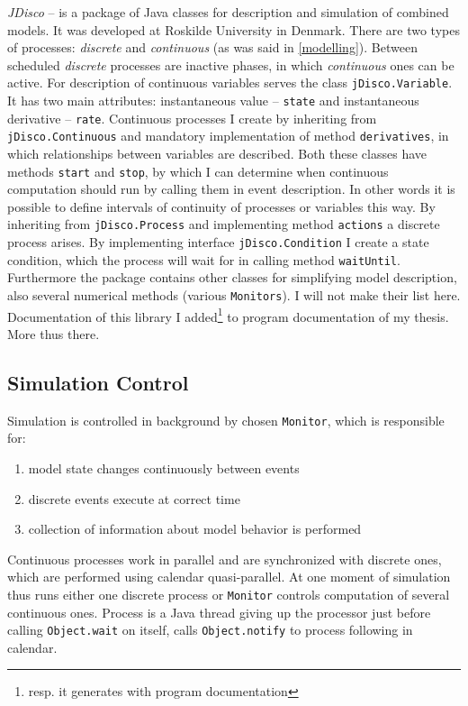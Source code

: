 \documentclass[english]{cls/fitthesis}
\newcommand{\cfr}[1]{\texttt{#1}}
\newcommand{\sourceRef}[1]{\cfr{#1}}
\begin{document}
  \emph{JDisco} -- \cite{helsgaun2001} is a package of Java classes for description and simulation of combined models.
  It was developed at Roskilde University in Denmark.
  There are two types of processes: \emph{discrete} and \emph{continuous} (as was said in \ref{modelling}).
  Between scheduled \emph{discrete} processes are inactive phases, in which \emph{continuous} ones can be active.
  For description of continuous variables serves the class \sourceRef{jDisco.Variable}. It has two main attributes:
  instantaneous value -- \cfr{state} and instantaneous derivative -- \cfr{rate}.
  Continuous processes I create by inheriting from \sourceRef{jDisco.Continuous} and mandatory implementation of method
  \cfr{derivatives}, in which relationships between variables are described.
  Both these classes have methods \cfr{start} and \cfr{stop},
  by which I can determine when continuous computation should run by calling them in event description.
  In other words it is possible to define intervals of continuity of processes or variables this way.
  By inheriting from \sourceRef{jDisco.Process} and implementing method \cfr{actions} a discrete process arises.
  By implementing interface \sourceRef{jDisco.Condition} I create a state condition, which the process will
  wait for in calling method \cfr{waitUntil}. Furthermore the package contains other classes for simplifying model description,
  also several numerical methods (various \cfr{Monitors}). I will not make their list here.
  Documentation of this library I added\footnote{resp. it generates with program documentation}
  to program documentation of my thesis. More thus there.

    \subsection{Simulation Control}
    Simulation is controlled in background by chosen \cfr{Monitor}, which is responsible for:
    \begin{enumerate}
      \item model state changes continuously between events
      \item discrete events execute at correct time
      \item collection of information about model behavior is performed
    \end{enumerate}
    Continuous processes work in parallel and are synchronized with discrete ones, which are performed using calendar
    quasi-parallel. At one moment of simulation thus runs either one discrete process or \cfr{Monitor}
    controls computation of several continuous ones.
    Process is a Java thread giving up the processor just before
    calling \sourceRef{Object.wait} on itself, calls \sourceRef{Object.notify} to process following in calendar.
\end{document}
